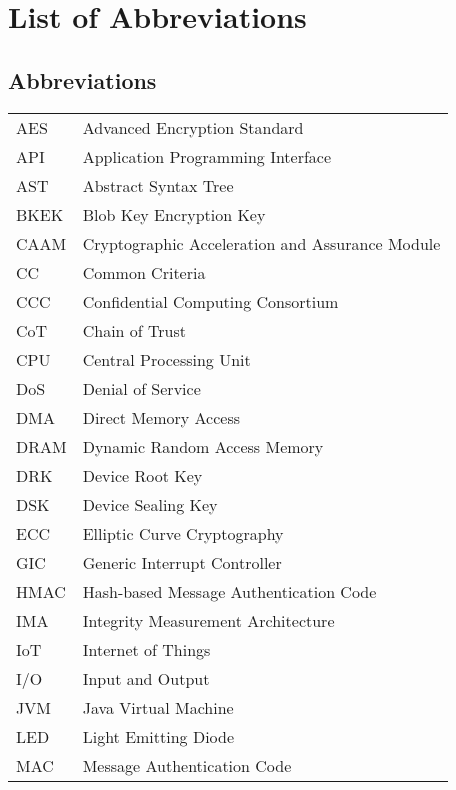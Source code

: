 \documentclass[master=cws,masteroption=vs,english]{kulemt}
\begin{document}
\listoffigures
\chapter{List of Abbreviations}
\section*{Abbreviations}
\begin{flushleft}
  \renewcommand{\arraystretch}{1.1}
  \begin{tabularx}{\textwidth}{@{}p{23mm}X@{}}
  	AES		& Advanced Encryption Standard \\
    API		& Application Programming Interface \\
    AST		& Abstract Syntax Tree \\
    BKEK		& Blob Key Encryption Key \\
    CAAM		& Cryptographic Acceleration and Assurance Module \\
    CC		& Common Criteria \\
    CCC		& Confidential Computing Consortium \\
    CoT		& Chain of Trust \\
    CPU		& Central Processing Unit \\
    	DoS		& Denial of Service \\
    	DMA		& Direct Memory Access \\
    DRAM		& Dynamic Random Access Memory \\
    	DRK		& Device Root Key \\
    	DSK		& Device Sealing Key \\
    	ECC		& Elliptic Curve Cryptography \\
    	GIC		& Generic Interrupt Controller \\
    	HMAC		& Hash-based Message Authentication Code \\
    	IMA		& Integrity Measurement Architecture \\
    	IoT   	& Internet of Things \\
    	I/O   	& Input and Output \\
    	JVM		& Java Virtual Machine \\
    	LED		& Light Emitting Diode \\
    	MAC		& Message Authentication Code \\

\end{tabularx}
\end{flushleft}
\end{document}
